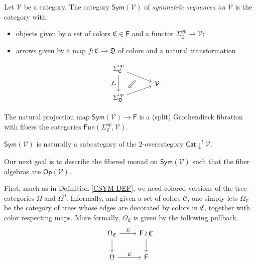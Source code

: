 \documentclass[a4paper,10pt
,draft
]{article}%
\renewcommand{\1}{\eta}%
\newcommand{\OC}{\Omega_{\mathfrak C}}
\begin{document}
\begin{definition}
Let $\mathcal{V}$ be a category.
The category $\mathsf{Sym}(\mathcal{V})$ of
\textit{symmetric sequences on $\mathcal{V}$} is the category with:
\begin{itemize}
\item objects given by a set of colors $\mathfrak{C} \in \mathsf{F}$
and a functor $\Sigma_{\mathfrak{C}}^{op} \to \mathcal{V}$;
\item arrows given by a map 
$f \colon \mathfrak{C} \to \mathfrak{D}$ of colors and a natural transformation

		\begin{equation}
		\begin{tikzcd}[row sep = tiny, column sep = 35pt]
			\Sigma_{\mathfrak{C}}^{op} \arrow{dr}[name=U]{} \arrow{dd}[swap]{f_{\**}}
		\\
			& \mathcal{V}
		\\
			|[alias=V]| \Sigma_{\mathfrak{D}}^{op} \arrow{ur}[swap]{}
		\arrow[Leftarrow, from=V, to=U,shorten >=0.25cm,shorten <=0.25cm
		,swap
		]
		\end{tikzcd}
		\end{equation}
\end{itemize}
\end{definition}


\begin{remark} The natural projection map
$\mathsf{Sym}(\mathcal{V}) \to \mathsf{F}$
is a (split) Grothendieck fibration with fibers the categories
$\mathsf{Fun}(\Sigma_{\mathfrak{C}}^{op},\mathcal{V})$.
\end{remark}


\begin{remark}\label{SUBCATDOWNL REM}
$\mathsf{Sym}(\mathcal{V})$ is naturally a subcategory of the $2$-overcategory
$\mathsf{Cat}\downarrow^l \mathcal{V}$.
\end{remark}



Our next goal is to describe the fibered monad on $\mathsf{Sym}(\mathcal{V})$ such that the fiber algebras are
$\mathsf{Op}(\mathcal{V})$.

First, much as in Definition \ref{CSYM DEF}, we need colored versions of the tree categories $\Omega$ and $\Omega^0$.
Informally, and given a set of colors $\mathcal{C}$, 
one simply lets $\Omega_{\mathfrak{C}}$
be the category of trees whose edges are decorated by colors in $\mathfrak{C}$, together with color respecting maps. More formally, $\Omega_{\mathfrak{C}}$ is given by the following pullback.
\begin{equation}
	\begin{tikzcd}
		\OC \arrow[d] \arrow[r, "E"] &
		\mathsf F \wr \mathfrak C \arrow[d]
\\
		\Omega \arrow[r, "E"] &
		\mathsf F
	\end{tikzcd}
\end{equation}
\end{document}
